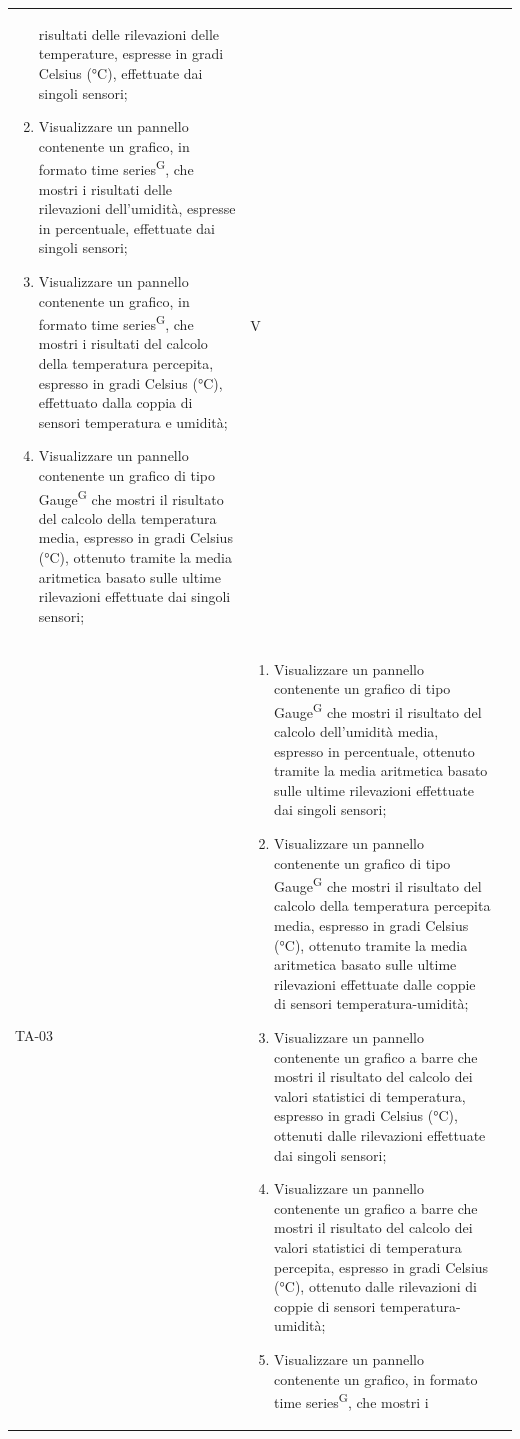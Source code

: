 \documentclass[8pt]{article}
\newcommand{\glossterm}[1]{#1\textsuperscript{G}} %
\begin{document}
\begin{longtable}{|>{\centering}p{2cm}|>{\RaggedRight}m{12cm}|>{\centering\arraybackslash}p{2cm}|}
\begin{enumerate}
            risultati delle rilevazioni delle temperature, espresse in gradi Celsius (°C),
            effettuate dai singoli sensori;
        \item Visualizzare un pannello contenente un grafico, in formato \glossterm{time series}, che mostri i
            risultati delle rilevazioni dell’umidità, espresse in percentuale, effettuate dai
            singoli sensori;
        \item Visualizzare un pannello contenente un grafico, in formato \glossterm{time series}, che mostri i
            risultati del calcolo della temperatura percepita, espresso in gradi Celsius (°C),
            effettuato dalla coppia di sensori temperatura e umidità;
        \item Visualizzare un pannello contenente un grafico di tipo \glossterm{Gauge} che mostri il risultato
            del calcolo della temperatura media, espresso in gradi Celsius (°C), ottenuto tramite la
            media aritmetica basato sulle ultime rilevazioni effettuate dai singoli sensori;
    \end{enumerate}
    & V \\
        TA-03 &
        \begin{enumerate}[start=8]
        \item Visualizzare un pannello contenente un grafico di tipo \glossterm{Gauge} che mostri il risultato
            del calcolo dell'umidità media, espresso in percentuale, ottenuto tramite la
            media aritmetica basato sulle ultime rilevazioni effettuate dai singoli sensori;
        \item Visualizzare un pannello contenente un grafico di tipo \glossterm{Gauge} che mostri il risultato
            del calcolo della temperatura percepita media, espresso in gradi Celsius (°C), ottenuto tramite la
            media aritmetica basato sulle ultime rilevazioni effettuate dalle coppie di sensori temperatura-umidità;
        \item Visualizzare un pannello contenente un grafico a barre che mostri il risultato
            del calcolo dei valori statistici di temperatura, espresso in gradi Celsius (°C), ottenuti dalle rilevazioni effettuate dai singoli sensori;
        \item Visualizzare un pannello contenente un grafico a barre che mostri il risultato
            del calcolo dei valori statistici di temperatura percepita, espresso in gradi Celsius (°C), ottenuto dalle rilevazioni di coppie di sensori temperatura-umidità;
        \item Visualizzare un pannello contenente un grafico, in formato \glossterm{time series}, che mostri i

\end{enumerate}
\end{longtable}
\end{document}
